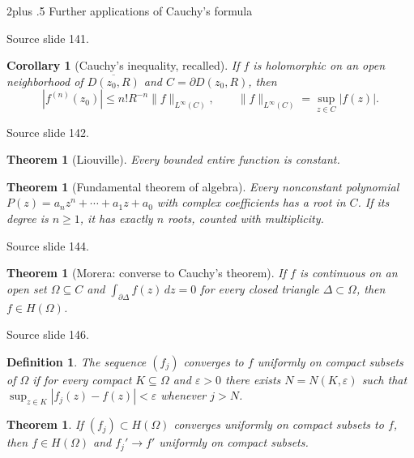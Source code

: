\documentclass[10pt,letterpaper,twoside,openright]{amsbook}
\makeatletter
\numberwithin{equation}{subsection}
\renewcommand{\section}{\@startsection{section}{1}
 {\z@}{2\baselineskip plus .5\baselineskip}
 {\baselineskip}{\normalfont\Large\bfseries\centering}}
\theoremstyle{sea-plain}
\newtheorem{theorem}[subsection]{Theorem}
\newtheorem{corollary}[subsection]{Corollary}
\theoremstyle{sea-definition}
\newtheorem{definition}[subsection]{Definition}
\theoremstyle{sea-exercise}
\newcommand{\RR}{\mathbb{R}}
\newcommand{\CC}{\mathbb{C}}
\newcommand{\DD}{\mathbb{D}}
\newcommand{\HH}{\mathbb{H}}
\newcommand{\Chat}{\mathbb{C}_{\infty}}
\def\CC{C}\def\RR{R}\def\DD{D}\def\HH{H}\def\Chat{C infinity}}
\newcommand{\src}[1]{\par\smallskip\noindent
 {\scriptsize\sffamily\color{SoftWhite}Source slide #1.}\par\nopagebreak\smallskip}
\makeatother
\begin{document}
\section{Further applications of Cauchy's formula}
\src{141}
\begin{corollary}[Cauchy's inequality, recalled]
If $f$ is holomorphic on an open neighborhood of $\overline{D(z_0,R)}$
and $C=\partial D(z_0,R)$, then
\[
|f^{(n)}(z_0)|\le n!R^{-n}\|f\|_{L^\infty(C)},\qquad
\|f\|_{L^\infty(C)}=\sup_{z\in C}|f(z)|.
\]
\end{corollary}
\src{142}
\begin{theorem}[Liouville]
Every bounded entire function is constant.
\end{theorem}
\begin{theorem}[Fundamental theorem of algebra]
Every nonconstant polynomial $P(z)=a_nz^n+\cdots+a_1z+a_0$
with complex coefficients has a root in $\CC$. If its degree is
$n\ge1$, it has exactly $n$ roots, counted with multiplicity.
\end{theorem}
\src{144}
\begin{theorem}[Morera: converse to Cauchy's theorem]
If $f$ is continuous on an open set $\Omega\subseteq\CC$ and
$\int_{\partial\Delta}f(z)\,dz=0$ for every closed triangle
$\Delta\subset\Omega$, then $f\in H(\Omega)$.
\end{theorem}
\src{146}
\begin{definition}
The sequence $(f_j)$ converges to $f$ \emph{uniformly on compact subsets}
of $\Omega$ if for every compact $K\subseteq\Omega$ and $\varepsilon>0$
there exists $N=N(K,\varepsilon)$ such that
$\sup_{z\in K}|f_j(z)-f(z)|<\varepsilon$ whenever $j>N$.
\end{definition}
\begin{theorem}
If $(f_j)\subset H(\Omega)$ converges uniformly on compact subsets to $f$,
then $f\in H(\Omega)$ and $f_j'\to f'$ uniformly on compact subsets.
\end{theorem}
\end{document}
